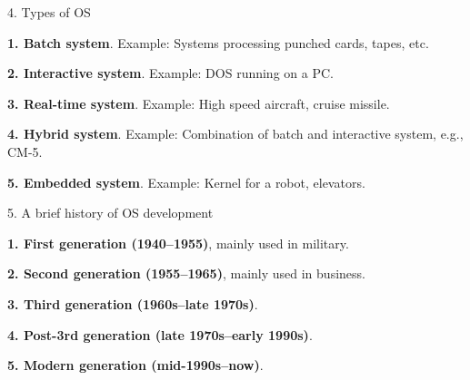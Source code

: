 \begin{slide}{ 4. Types of OS}
\item {\bf 1. Batch system}. Example: Systems processing punched cards, tapes, etc.
\vspace{2cm}
\item {\bf 2. Interactive system}. Example: DOS running on a PC.
\vspace{2cm}
\item {\bf 3. Real-time system}. Example: High speed aircraft, cruise missile.
\vspace{2cm}
\item {\bf 4. Hybrid system}. Example: Combination of batch and interactive system, e.g., CM-5.
\vspace{2cm}
\item {\bf 5. Embedded system}. Example: Kernel for a robot, elevators.
\end{slide}

\begin{slide}{ 5. A brief history of OS development}
\item {\bf 1. First generation (1940--1955)}, mainly used in military.
\vspace{3cm}
\item {\bf 2. Second generation (1955--1965)}, mainly used in business.
\vspace{3cm}
\item {\bf 3. Third generation (1960s--late 1970s)}.
\vspace{3cm}
\item {\bf 4. Post-3rd generation (late 1970s--early 1990s)}.
\vspace{3cm}
\item {\bf 5. Modern generation (mid-1990s--now)}.
\end{slide}







